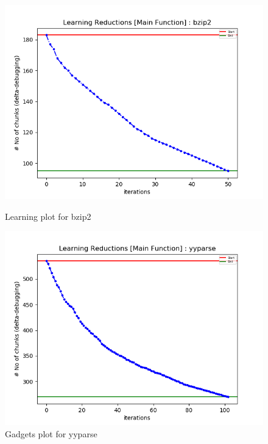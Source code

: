\documentclass{relatorio}
\begin{document}
\begin{figure}[H]
	\includegraphics[width=0.65\linewidth]{imgs/chisel_learning_bzip2_plot.png}
	\caption{Learning plot for \color{blue} bzip2}%
	\label{fig:plant}
	\centering
	\captionsetup{justification=centering}
	\includegraphics[width=0.65\linewidth]{imgs/chisel_learning_yyparse_plot.png}
	\caption{Gadgets plot for \color{blue} yyparse}%
	\label{fig:plant}
\end{figure}
\end{document}
